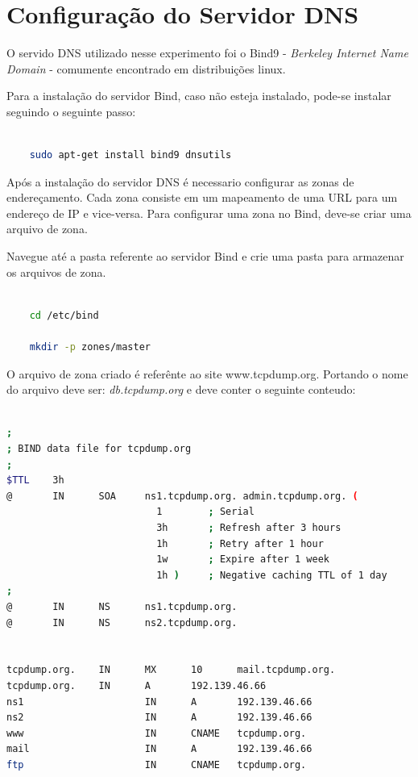 \documentclass[12pt,openright,a4paper]{report}
\begin{document}
\section{Configuração do Servidor DNS}
\label{sec_configuracao}

O servido DNS utilizado nesse experimento foi o Bind9 - \textit{Berkeley Internet Name Domain} - comumente encontrado em distribuições linux.

Para a instalação do servidor Bind, caso não esteja instalado, pode-se instalar seguindo o seguinte passo:

\begin{lstlisting}[language=bash]

	sudo apt-get install bind9 dnsutils

\end{lstlisting}

Após a instalação do servidor DNS é necessario configurar as zonas de endereçamento. Cada zona consiste em um mapeamento de uma URL para um endereço de IP e vice-versa. Para configurar uma zona no Bind, deve-se criar uma arquivo de zona.

Navegue até a pasta referente ao servidor Bind e crie uma pasta para armazenar os arquivos de zona.

\begin{lstlisting}[language=bash]

	cd /etc/bind

	mkdir -p zones/master

\end{lstlisting}

O arquivo de zona criado é referênte ao site www.tcpdump.org. Portando o nome do arquivo deve ser: \textit{db.tcpdump.org} e deve conter o seguinte conteudo:

\begin{lstlisting}[language=bash]

;
; BIND data file for tcpdump.org
;
$TTL    3h
@       IN      SOA     ns1.tcpdump.org. admin.tcpdump.org. (
                          1        ; Serial
                          3h       ; Refresh after 3 hours
                          1h       ; Retry after 1 hour
                          1w       ; Expire after 1 week
                          1h )     ; Negative caching TTL of 1 day
;
@       IN      NS      ns1.tcpdump.org.
@       IN      NS      ns2.tcpdump.org.


tcpdump.org.    IN      MX      10      mail.tcpdump.org.
tcpdump.org.    IN      A       192.139.46.66
ns1                     IN      A       192.139.46.66
ns2                     IN      A       192.139.46.66
www                     IN      CNAME   tcpdump.org.
mail                    IN      A       192.139.46.66
ftp                     IN      CNAME   tcpdump.org.

\end{lstlisting}
\end{document}

